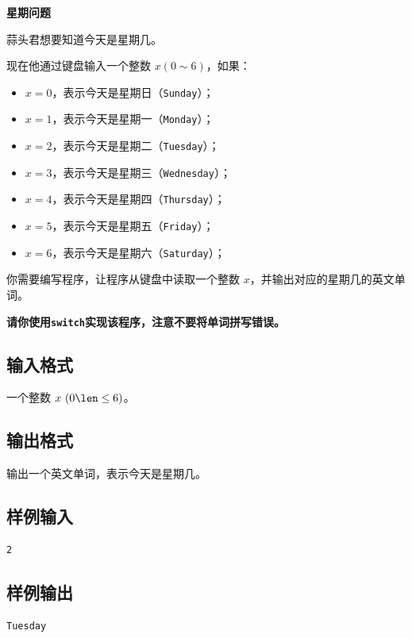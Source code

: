 \documentclass{article}
\newcommand{\problemname}[1]{\begin{center}\Large\bfseries #1\end{center}}
\begin{document}
\problemname{星期问题}

蒜头君想要知道今天是星期几。

现在他通过键盘输入一个整数 $x(0\sim6)$，如果：

\begin{itemize}
  \item $x=0$，表示今天是星期日（\texttt{Sunday}）；

  \item $x=1$，表示今天是星期一（\texttt{Monday}）；

  \item $x=2$，表示今天是星期二（\texttt{Tuesday}）；

  \item $x=3$，表示今天是星期三（\texttt{Wednesday}）；

  \item $x=4$，表示今天是星期四（\texttt{Thursday}）；

  \item $x=5$，表示今天是星期五（\texttt{Friday}）；

  \item $x=6$，表示今天是星期六（\texttt{Saturday}）；

\end{itemize}
你需要编写程序，让程序从键盘中读取一个整数 $x$，并输出对应的星期几的英文单词。

\textbf{请你使用\texttt{switch}实现该程序，注意不要将单词拼写错误。}

\subsection*{输入格式}
一个整数 $x\text{ }(0\len\le6)$。

\subsection*{输出格式}
输出一个英文单词，表示今天是星期几。

\subsection*{样例输入}
\begin{verbatim}
2
\end{verbatim}

\subsection*{样例输出}
\begin{verbatim}
Tuesday
\end{verbatim}
\end{document}
